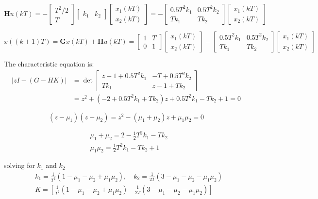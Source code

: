 $\mathbf{H}u(kT)=-\begin{bmatrix} T^2/2  \\ T \end{bmatrix}\begin{bmatrix} k_1 & k_2 \end{bmatrix} \begin{bmatrix} x_1(kT) \\ x_2(kT) \end{bmatrix} = -\begin{bmatrix} 0.5T^2 k_1 & 0.5T^2 k_2 \\ T k_1 & Tk_2 \end{bmatrix}\begin{bmatrix} x_1(kT) \\ x_2(kT) \end{bmatrix}$

$x((k+1)T)=\mathbf{G}x(kT)+\mathbf{H}u(kT)=\begin{bmatrix} 1 & T \\ 0 & 1 \end{bmatrix}\begin{bmatrix} x_1(kT) \\ x_2(kT) \end{bmatrix}-\begin{bmatrix} 0.5T^2 k_1 & 0.5T^2 k_2 \\ T k_1 & Tk_2 \end{bmatrix}\begin{bmatrix} x_1(kT) \\ x_2(kT) \end{bmatrix}$

The characteristic equation is:
\vspace{-0.25cm}
\begin{align*}
|zI-(G-HK)|&= \det\begin{bmatrix} z-1+0.5T^2 k_1 & -T+0.5T^2 k_2 \\ T k_1 & z-1+Tk_2 \end{bmatrix} \\
& = z^2+(-2+0.5T^2k_1+Tk_2)z+0.5T^2k_1-Tk_2+1=0
\end{align*}

\[
(z-\mu_1)(z-\mu_2) = z^2 - (\mu_1+\mu_2)z + \mu_1\mu_2 =0
\]

\begin{align*}
& \mu_1 + \mu_2 = 2 -\frac{1}{2}T^2k_1 - Tk_2 \\
& \mu_1 \mu_2 = \frac{1}{2}T^2k_1-Tk_2+1 
\end{align*}

solving for $k_1$ and $k_2$
\begin{align*}
& k_1 = \frac{1}{T^2}(1-\mu_1-\mu_2+\mu_1\mu_2), \quad k_2 = \frac{1}{2T}(3-\mu_1-\mu_2-\mu_1\mu_2) \\
& K = [\frac{1}{T^2}(1-\mu_1-\mu_2+\mu_1\mu_2) \quad \frac{1}{2T}(3-\mu_1-\mu_2-\mu_1\mu_2) ]
\end{align*}

